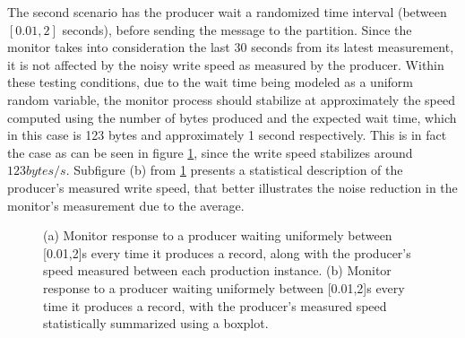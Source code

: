 The second scenario has the producer wait a randomized time interval (between
$[0.01, 2]$ seconds), before sending the message to the partition. Since the
monitor takes into consideration the last 30 seconds from its latest
measurement, it is not affected by the noisy write speed as measured by the
producer. Within these testing conditions, due to the wait time being modeled as
a uniform random variable, the monitor process should stabilize at approximately
the speed computed using the number of bytes produced and the expected wait
time, which in this case is 123 bytes and approximately 1 second respectively.
This is in fact the case as can be seen in figure \ref{fig:monitor_random},
since the write speed stabilizes around $123 bytes/s$. Subfigure (b) from
\ref{fig:monitor_random} presents a statistical description of the producer's
measured write speed, that better illustrates the noise reduction in the
monitor's measurement due to the average.
\begin{figure}[!htb] 
    \centering
    \caption{
        (a) Monitor response to a producer waiting uniformely between [0.01,2]s
        every time it produces a record, along with the producer's speed
        measured between each production instance.
        (b) Monitor response to a producer waiting uniformely between [0.01,2]s
        every time it produces a record, with the producer's measured speed
        statistically summarized using a boxplot.
    } 
    \label{fig:monitor_random} 
\end{figure}


